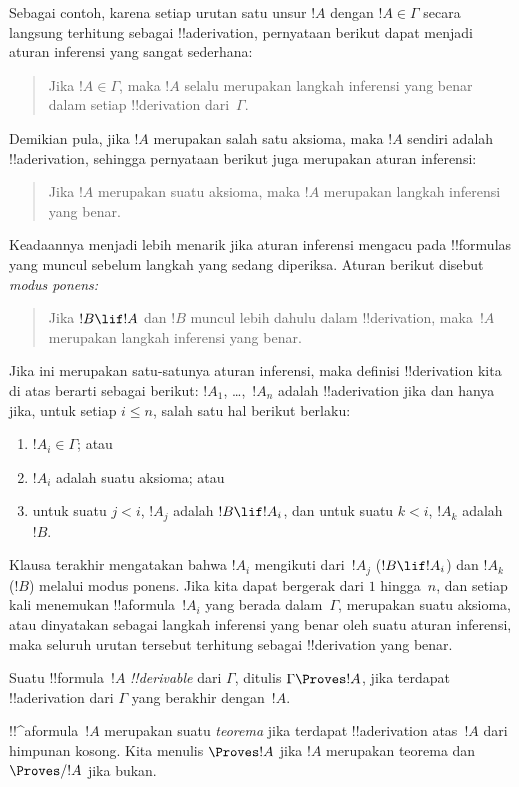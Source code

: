 \documentclass[../../../include/open-logic-section]{subfiles}
\begin{document}
Sebagai contoh, karena setiap urutan satu unsur $!A$ dengan
$!A \in \Gamma$ secara langsung terhitung sebagai !!a{derivation},
pernyataan berikut dapat menjadi aturan inferensi yang sangat sederhana:
\begin{quote}
  Jika $!A \in \Gamma$, maka $!A$ selalu merupakan langkah inferensi
  yang benar dalam setiap !!{derivation} dari~$\Gamma$.
\end{quote}
Demikian pula, jika $!A$ merupakan salah satu aksioma, maka $!A$ sendiri
adalah !!a{derivation}, sehingga pernyataan berikut juga merupakan aturan
inferensi:
\begin{quote}
  Jika $!A$ merupakan suatu aksioma, maka $!A$ merupakan langkah
  inferensi yang benar.
\end{quote}
Keadaannya menjadi lebih menarik jika aturan inferensi mengacu pada
!!{formula}s yang muncul sebelum langkah yang sedang diperiksa. Aturan
berikut disebut \emph{modus ponens:}
\begin{quote}
  Jika $!B \lif !A$ dan $!B$ muncul lebih dahulu dalam !!{derivation},
  maka~$!A$ merupakan langkah inferensi yang benar.
\end{quote}
Jika ini merupakan satu-satunya aturan inferensi, maka definisi
!!{derivation} kita di atas berarti sebagai berikut: $!A_1$,
\dots,~$!A_n$ adalah !!a{derivation} jika dan hanya jika, untuk setiap
$i \le n$, salah satu hal berikut berlaku:
\begin{enumerate}
\item $!A_i \in \Gamma$; atau
\item $!A_i$ adalah suatu aksioma; atau
\item untuk suatu $j < i$, $!A_j$ adalah $!B \lif !A_i$, dan untuk
  suatu $k < i$, $!A_k$ adalah~$!B$.
\end{enumerate}
Klausa terakhir mengatakan bahwa $!A_i$ mengikuti dari~$!A_j$
($!B \lif !A_i$) dan $!A_k$ ($!B$) melalui modus ponens. Jika kita dapat
bergerak dari $1$ hingga~$n$, dan setiap kali menemukan
!!a{formula}~$!A_i$ yang berada dalam~$\Gamma$, merupakan suatu aksioma,
atau dinyatakan sebagai langkah inferensi yang benar oleh suatu aturan
inferensi, maka seluruh urutan tersebut terhitung sebagai
!!{derivation} yang benar.

\begin{defn}[!!^{derivability}]
Suatu !!{formula}~$!A$ \emph{!!{derivable}} dari $\Gamma$, ditulis
$\Gamma \Proves !A$, jika terdapat !!a{derivation} dari $\Gamma$ yang
berakhir dengan~$!A$.
\end{defn}

\begin{defn}[Teorema]
!!^a{formula}~$!A$ merupakan suatu \emph{teorema} jika terdapat
!!a{derivation} atas~$!A$ dari himpunan kosong. Kita menulis
$\Proves !A$ jika $!A$ merupakan teorema dan $\Proves/ !A$ jika bukan.
\end{defn}
\end{document}

